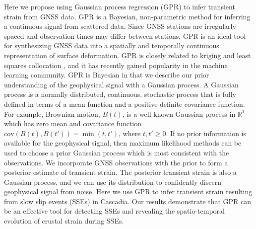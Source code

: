\documentclass[10pt,letter]{article}
\begin{document}
Here we propose using Gaussian process regression (GPR) \citep{Rasmussen2006} to infer transient strain from GNSS data. GPR is a Bayesian, non-parametric method for inferring a continuous signal from scattered data. Since GNSS stations are irregularly spaced and observation times may differ between stations, GPR is an ideal tool for synthesizing GNSS data into a spatially and temporally continuous representation of surface deformation. GPR is closely related to kriging \citep{Cressie1992} and least squares collocation \citep{Kato1998}, and it has recently gained popularity in the machine learning community. GPR is Bayesian in that we describe our prior understanding of the geophysical signal with a Gaussian process. A Gaussian process is a normally distributed, continuous, stochastic process that is fully defined in terms of a mean function and a positive-definite covariance function. For example, Brownian motion, $B(t)$, is a well known Gaussian process in $\mathbb{R}^1$ which has zero mean and covariance function $\mathrm{cov}(B(t),B(t')) = \min(t,t')$, where $t,t' \ge 0$. If no prior information is available for the geophysical signal, then maximum likelihood methods can be used to choose a prior Gaussian process which is most consistent with the observations.  We incorporate GNSS observations with the prior to form a posterior estimate of transient strain.  The posterior transient strain is also a Gaussian process, and we can use its distribution to confidently discern geophysical signal from noise. Here we use GPR to infer transient strain resulting from slow slip events (SSEs) in Cascadia. Our results demonstrate that GPR can be an effective tool for detecting SSEs and revealing the spatio-temporal evolution of crustal strain during SSEs. 
\end{document}
